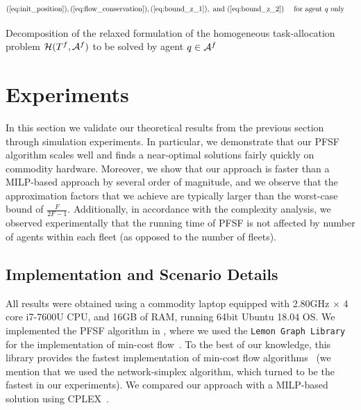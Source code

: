 \documentclass[conference]{IEEEtran}
\begin{document}
\begin{table}[!ht]
{\begin{minipage}[t]{1\textwidth - 2\fboxsep - 2\fboxrule}
\begin{subequations}
\begin{align}
(\ref{eq:init_position}), (\ref{eq:flow_conservation}), (\ref{eq:bound_z_1}), \textrm{ and } (\ref{eq:bound_z_2}) & & & \textrm{ for agent } q \textrm{ only } \nonumber
\end{align}
\end{subequations}
    \end{minipage}}
\vspace{5pt}
\caption{Decomposition of the relaxed formulation of the homogeneous task-allocation problem $\mathcal{H}(T^f, \mathcal{A}^f)$ to be solved by agent $q \in \mathcal{A}^f$}
\label{tbl:problem_homo_relaxed_decomposed}
\end{table}

\section{Experiments}\label{sec:experiments}
In this section we validate our theoretical results from the previous section through simulation experiments. In particular, we demonstrate that our PFSF algorithm  scales well and finds a near-optimal solutions fairly quickly on commodity hardware. Moreover, we show that our approach is faster than a MILP-based approach by several order of magnitude, and we observe that the approximation factors that we achieve are typically larger than the worst-case bound of $\frac{F}{2F-1}$. Additionally, in accordance with the complexity analysis, we observed experimentally that the running time of PFSF is not affected by number of agents within each fleet (as opposed to the number of fleets).

\subsection{Implementation and Scenario Details}
All results were obtained using a commodity laptop equipped with 2.80GHz $\times$ 4 core i7-7600U CPU, and 16GB of RAM, running 64bit Ubuntu 18.04 OS. We implemented the PFSF algorithm in \cpp, where we used the \texttt{Lemon Graph Library} for the implementation of min-cost flow~\cite{Lemon}. To the best of our knowledge, this library provides the fastest implementation of min-cost flow algorithms~\cite{Kovacs15} (we mention that we used the network-simplex algorithm, which turned to be the fastest in our experiments). We compared our approach with a MILP-based solution using CPLEX~\cite{Cplex}.
\end{document}
